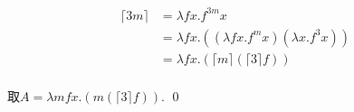 \begin{pf} \rm \;
$$
    \begin{aligned}
\lceil 3m\rceil 
&= \lambda f x. f^{3m} x \\
&= \lambda f x. ((\lambda fx. f^m x) (\lambda x. f^3 x)) \\
&= \lambda f x. (\lceil m\rceil (\lceil 3\rceil f))  \\       
\end{aligned}
$$

取$A=\lambda mfx. (m (\lceil 3\rceil f))$.
    \qed 
\end{pf}